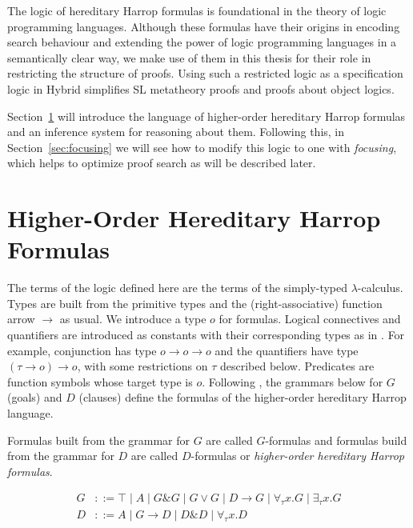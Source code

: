 The logic of hereditary Harrop formulas is foundational in the theory of logic programming languages. Although these formulas have their origins in encoding search behaviour and extending the power of logic programming languages in a semantically clear way, we make use of them in this thesis for their role in restricting the structure of proofs. Using such a restricted logic as a specification logic in Hybrid simplifies SL metatheory proofs and proofs about object logics.

Section~\ref{sec:hohh} will introduce the language of higher-order hereditary Harrop formulas and an inference system for reasoning about them. Following this, in Section~\ref{sec:focusing} we will see how to modify this logic to one with \emph{focusing}, which helps to optimize proof search as will be described later.

\section{Higher-Order Hereditary Harrop Formulas}
\label{sec:hohh}

The terms of the logic defined here are the terms of the simply-typed $\lambda$-calculus. Types are built from the primitive types and the (right-associative) function arrow $\rightarrow$ as usual. We introduce a type $o$ for formulas. Logical connectives and quantifiers are introduced as constants with their corresponding types as in \cite{Church40}. For example, conjunction has type $o \rightarrow o \rightarrow o$ and the quantifiers have type $(\tau\rightarrow o)\rightarrow o$, with some restrictions on $\tau$ described below. Predicates are function symbols whose target type is $o$. Following \cite{LProlog}, the grammars below for $G$ (goals) and $D$ (clauses) define the formulas of the higher-order hereditary Harrop language.

\begin{defnc}
Formulas built from the grammar for $G$ are called $G$-formulas and formulas build from the grammar for $D$ are called $D$-formulas or \emph{higher-order hereditary Harrop formulas}.
\end{defnc}

\begin{align*}
G & ::=
 \top \mathrel{|}
 A \mathrel{|}
 G\mathrel{\&}G \mathrel{|}
 G \lor G \mathrel{|}
 D\longrightarrow G \mathrel{|}
 \forall_\tau x. G \mathrel{|}
 \exists_\tau x. G
\\
D & ::=
 A \mathrel{|}
 G\longrightarrow D \mathrel{|}
 D \mathrel{\&} D \mathrel{|}
 \forall_\tau x. D
\end{align*}

